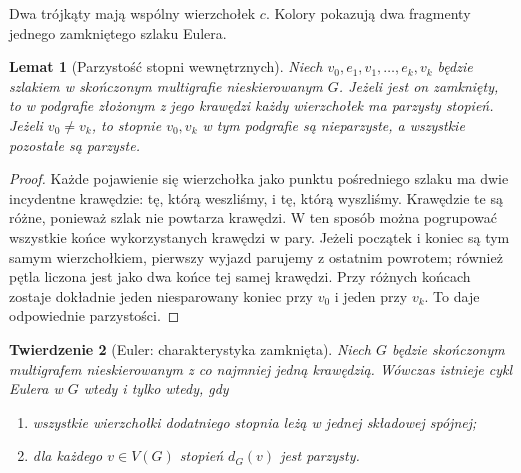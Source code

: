 \documentclass[11pt,a4paper]{report}
\numberwithin{equation}{section}
\theoremstyle{plain}
\newtheorem{twierdzenie}{Twierdzenie}[section]
\newtheorem{lemat}[twierdzenie]{Lemat}
\theoremstyle{definition}
\theoremstyle{remark}
\begin{document}
\begin{center}

{\footnotesize Dwa trójkąty mają wspólny wierzchołek $c$.
Kolory pokazują dwa fragmenty jednego zamkniętego szlaku Eulera.}
\end{center}

\begin{lemat}[Parzystość stopni wewnętrznych]
\label{lem:tg-euler-parity}
Niech $v_0,e_1,v_1,\dots,e_k,v_k$ będzie szlakiem
w skończonym multigrafie nieskierowanym $G$. Jeżeli jest on
zamknięty, to w podgrafie złożonym z jego krawędzi każdy
wierzchołek ma parzysty stopień. Jeżeli $v_0\ne v_k$,
to stopnie $v_0,v_k$ w tym podgrafie są nieparzyste,
a wszystkie pozostałe są parzyste.
\end{lemat}

\begin{proof}
Każde pojawienie się wierzchołka jako punktu pośredniego
szlaku ma dwie incydentne krawędzie: tę, którą weszliśmy,
i tę, którą wyszliśmy. Krawędzie te są różne, ponieważ szlak
nie powtarza krawędzi. W ten sposób można pogrupować
wszystkie końce wykorzystanych krawędzi w pary.
Jeżeli początek i koniec są tym samym wierzchołkiem,
pierwszy wyjazd parujemy z ostatnim powrotem; również pętla
liczona jest jako dwa końce tej samej krawędzi. Przy różnych
końcach zostaje dokładnie jeden niesparowany koniec
przy $v_0$ i jeden przy $v_k$. To daje odpowiednie parzystości.
\end{proof}

\begin{twierdzenie}[Euler: charakterystyka zamknięta]
\label{thm:tg-euler-circuit}
Niech $G$ będzie skończonym multigrafem nieskierowanym
z co najmniej jedną krawędzią. Wówczas istnieje cykl Eulera
w $G$ wtedy i tylko wtedy, gdy
\begin{enumerate}[label=(\roman*)]
\item wszystkie wierzchołki dodatniego stopnia leżą w jednej
składowej spójnej;
\item dla każdego $v\in V(G)$ stopień $d_G(v)$ jest parzysty.
\end{enumerate}
\end{twierdzenie}
\end{document}
